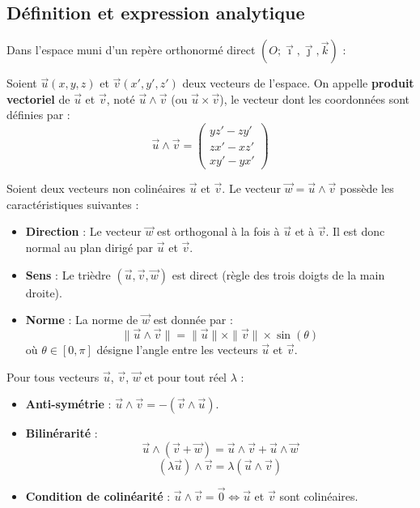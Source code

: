\subsection{Définition et expression analytique}

Dans l'espace muni d'un repère orthonormé direct $(O; \vec{\imath}, \vec{\jmath}, \vec{k})$ :

\begin{definition}
Soient $\vec{u}(x, y, z)$ et $\vec{v}(x', y', z')$ deux vecteurs de l'espace.
On appelle \textbf{produit vectoriel} de $\vec{u}$ et $\vec{v}$, noté $\vec{u} \wedge \vec{v}$ (ou $\vec{u} \times \vec{v}$), le vecteur dont les coordonnées sont définies par :
\[
\vec{u} \wedge \vec{v} = \begin{pmatrix} y z' - z y' \\ z x' - x z' \\ x y' - y x' \end{pmatrix}
\]
\end{definition}

\begin{propriete}
Soient deux vecteurs non colinéaires $\vec{u}$ et $\vec{v}$. Le vecteur $\vec{w} = \vec{u} \wedge \vec{v}$ possède les caractéristiques suivantes :
\begin{itemize}
    \item \textbf{Direction} : Le vecteur $\vec{w}$ est orthogonal à la fois à $\vec{u}$ et à $\vec{v}$. Il est donc normal au plan dirigé par $\vec{u}$ et $\vec{v}$.
    \item \textbf{Sens} : Le trièdre $(\vec{u}, \vec{v}, \vec{w})$ est direct (règle des trois doigts de la main droite).
    \item \textbf{Norme} : La norme de $\vec{w}$ est donnée par :
    \[
    \|\vec{u} \wedge \vec{v}\| = \|\vec{u}\| \times \|\vec{v}\| \times \sin(\theta)
    \]
    où $\theta \in [0, \pi]$ désigne l'angle entre les vecteurs $\vec{u}$ et $\vec{v}$.
\end{itemize}
\end{propriete}

\begin{propriete}
Pour tous vecteurs $\vec{u}$, $\vec{v}$, $\vec{w}$ et pour tout réel $\lambda$ :
\begin{itemize}
    \item \textbf{Anti-symétrie} : $\vec{u} \wedge \vec{v} = - (\vec{v} \wedge \vec{u})$.
    \item \textbf{Bilinérarité} : 
    \[
    \vec{u} \wedge (\vec{v} + \vec{w}) = \vec{u} \wedge \vec{v} + \vec{u} \wedge \vec{w}
    \]
    \[
    (\lambda \vec{u}) \wedge \vec{v} = \lambda (\vec{u} \wedge \vec{v})
    \]
    \item \textbf{Condition de colinéarité} : $\vec{u} \wedge \vec{v} = \vec{0} \iff \vec{u}$ et $\vec{v}$ sont colinéaires.
\end{itemize}
\end{propriete}

